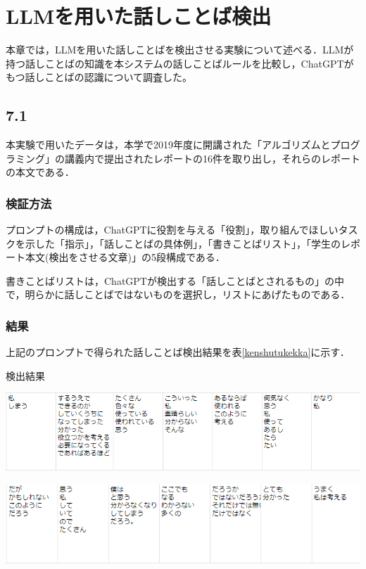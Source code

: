 \chapter{LLMを用いた話しことば検出 \label{c7}}

本章では，LLMを用いた話しことばを検出させる実験について述べる．LLMが持つ話しことばの知識を本システムの話しことばルールを比較し，ChatGPTがもつ話しことばの認識について調査した。

\section{7.1 \label{c7s1}}
本実験で用いたデータは，本学で2019年度に開講された「アルゴリズムとプログラミング」の講義内で提出されたレポートの16件を取り出し，それらのレポートの本文である．

\subsection{検証方法}
プロンプトの構成は，ChatGPTに役割を与える「役割」，取り組んでほしいタスクを示した「指示」，「話しことばの具体例」，「書きことばリスト」，「学生のレポート本文(検出をさせる文章)」の5段構成である．




書きことばリストは，ChatGPTが検出する「話しことばとされるもの」の中で，明らかに話しことばではないものを選択し，リストにあげたものである．

\subsection{結果}
上記のプロンプトで得られた話しことば検出結果を表\ref{kenshutukekka}に示す．

\begin{table}[H]
	\centering
        \caption{検出結果}
 	\includegraphics[width=150mm]{image/kenshutukekka-a.png}
	\label{kenshutukekka}
\end{table}
\begin{table}[H]
    \centering
    \includegraphics[width=150mm]{image/kenshutukekka-b.png}
    \label{kenshutukekka-2}
\end{table}


